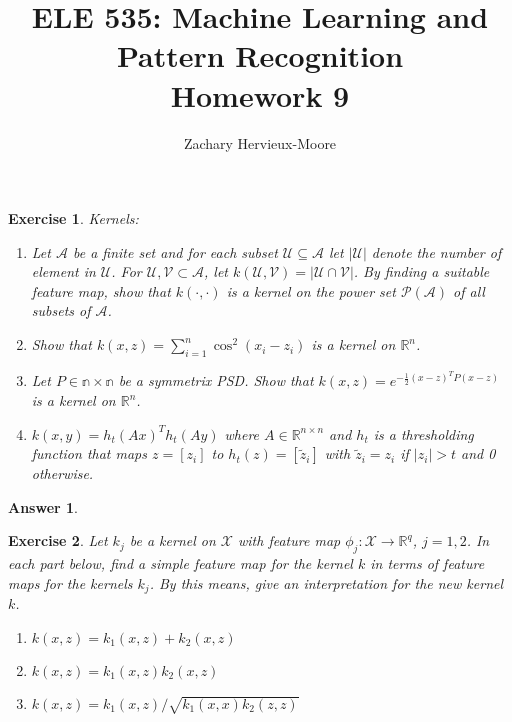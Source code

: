 \documentclass[12pt]{article}
\title{ELE 535: Machine Learning and Pattern Recognition \\ Homework 9}
\author{Zachary Hervieux-Moore}
\date{\displaydate{date}}
\theoremstyle{colon}
\newtheorem{exercise}{Exercise}
\newtheorem*{answer}{Answer}
\begin{document}
\maketitle

\clearpage

\begin{exercise}
  Kernels:

  \begin{enumerate}[label=\alph*)]
    \item Let $\mathcal{A}$ be a finite set and for each subset $\mathcal{U} \subseteq \mathcal{A}$ let $\lvert \mathcal{U} \rvert$ denote the number of element in $\mathcal{U}$. For $\mathcal{U}, \mathcal{V} \subset \mathcal{A}$, let $k(\mathcal{U}, \mathcal{V}) = \lvert \mathcal{U} \cap \mathcal{V} \rvert$. By finding a suitable feature map, show that $k(\cdot, \cdot)$ is a kernel on the power set $\mathcal{P}(\mathcal{A})$ of all subsets of $\mathcal{A}$.

    \item Show that $k(x,z) = \sum_{i=1}^n \cos^2 (x_i - z_i)$ is a kernel on $\mathbb{R}^n$.

    \item Let $P \in \mathbb{n \times n}$ be a symmetrix PSD. Show that $k(x,z) = e^{-\frac{1}{2} (x-z)^T P (x-z)}$ is a kernel on $\mathbb{R}^n$.

    \item $k(x,y) = h_t(Ax)^T h_t(Ay)$ where $A \in \mathbb{R}^{n \times n}$ and $h_t$ is a thresholding function that maps $z = [z_i]$ to $h_t(z) = [\tilde{z}_i]$ with $\tilde{z}_i = z_i$ if $\lvert z_i \rvert > t$ and 0 otherwise.
  \end{enumerate}
\end{exercise}

\begin{answer}

\end{answer}

\clearpage

\begin{exercise}
  Let $k_j$ be a kernel on $\mathcal{X}$ with feature map $\phi_j: \mathcal{X} \rightarrow \mathbb{R}^q$, $j = 1, 2$. In each part below, find a simple feature map for the kernel $k$ in terms of feature maps for the kernels $k_j$. By this means, give an interpretation for the new kernel $k$.

  \begin{enumerate}[label=\alph*)]
    \item $k(x,z) = k_1(x,z) + k_2(x,z)$

    \item $k(x,z) = k_1(x,z) k_2(x,z)$

    \item $k(x,z) = k_1(x,z)/ \sqrt{k_1(x,x) k_2(z,z)}$
  \end{enumerate}
\end{exercise}
\end{document}
